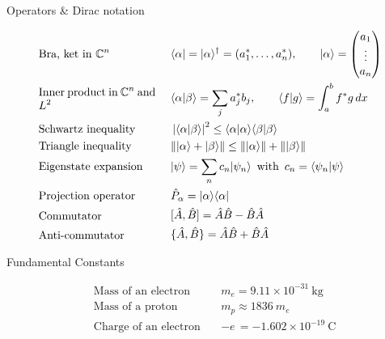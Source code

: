 \documentclass{article}[a4paper]
\begin{document}
\begin{minipage}[t]{0.5\textwidth}
  \noindent
  \begin{center}
    \large{Operators \& Dirac notation}
  \end{center}
  \noindent
  \begin{align*}
    &\textrm{\parbox{0.3\textwidth}{Bra, ket in $\mathbb{C}^n$}} & ~&\langle \alpha | = | \alpha \rangle^\dagger = (a_1^*, \dots , a_n^*),\qquad | \alpha \rangle = \begin{pmatrix}a_1\\ \vdots \\ a_n\end{pmatrix}\\
    &\textrm{\parbox{0.3\textwidth}{Inner product in $\mathbb{C}^n$ and $L^2$}} & ~& \langle \alpha | \beta \rangle = \sum_j a^*_j b_j, \qquad \langle f | g \rangle = \int_a^b f^* g\,dx\\
    &\textrm{\parbox{0.3\textwidth}{Schwartz inequality}} & ~& \left| \langle \alpha | \beta \rangle \right|^2 \leq \langle \alpha | \alpha\rangle \langle \beta | \beta \rangle\\
    &\textrm{\parbox{0.3\textwidth}{Triangle inequality}} & ~&  \| |\alpha\rangle + |\beta\rangle \| \leq \| |\alpha\rangle \| + \| |\beta\rangle \| \\
    &\textrm{\parbox{0.3\textwidth}{Eigenstate expansion}} & ~& | \psi \rangle  = \sum_n c_n | \psi_n \rangle\,\,\, \textrm{with}\,\,\,c_n = \langle \psi_n | \psi \rangle\\
    &\textrm{\parbox{0.3\textwidth}{Projection operator}} & ~& \hat{P}_\alpha = | \alpha \rangle\langle \alpha |\\
    &\textrm{\parbox{0.3\textwidth}{Commutator}} & ~&[\hat{A},\hat{B}] = \hat{A}\hat{B} - \hat{B}\hat{A}\\
    &\textrm{\parbox{0.3\textwidth}{Anti-commutator}} & ~&\{\hat{A},\hat{B}\} = \hat{A}\hat{B} + \hat{B}\hat{A}\\
  \end{align*}
  \begin{center}
    \large{Fundamental Constants}
  \end{center}
  \noindent
  \begin{align*}
    &\textrm{Mass of an electron}  & ~&m_e = 9.11 \times 10^{-31} ~\textrm{kg}\\
    &\textrm{Mass of a proton}     & ~&m_p \approx 1836~m_e\\
    &\textrm{Charge of an electron}& ~&-e\, = -1.602\times 10^{-19}~\textrm{C}\\

\end{align*}
\end{minipage}
\end{document}
